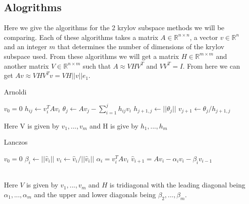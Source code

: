 \documentclass{article}
\begin{document}
\subsection{Alogrithms}
Here we give the algorithms for the 2 krylov subspace methods we will be comparing.
Each of these algorithms takes a matrix $A\in \mathbb{R}^{n\times n}$, a vector $v \in \mathbb{R}^n$ and an integer $m$ that determines the number of dimensions of the krylov subspace used.
From these algorithms we will get a matrix $H \in \mathbb{R}^{m\times m}$ and another matrix $V \in \mathbb{R}^{n\times m}$ such that $A \approx VHV^T$ and $VV^T = I$.
From here we can get $Av \approx VHV^Tv = VH||v||e_1$.

\begin{algorithm}
\caption{Arnoldi \cite{Fan2018}} %
\begin{algorithmic}
\State $v_0 = 0$
\State$h_{ij} \gets v_i^T A v_i$
\EndFor
\State$\theta_j \gets Av_j - \sum^j_{i=1} h_{ij}v_i$
\State$h_{j+1,j} \gets ||\theta_j||$
\State$v_{j+1} \gets \theta_j/h_{j+1,j}$
\EndFor
\EndProcedure
\end{algorithmic}
\end{algorithm}
Here V is given by $v_1,...,v_m$ and H is give by $h_1,...,h_m$
\begin{algorithm}
\caption{Lanczos \cite{OJALVO1970}}
\begin{algorithmic}
\State $v_0 = 0$
\State$\beta_i \gets || \hat v_i ||$
\State$v_i \gets \hat v_i / || \hat v_i ||$
\State$\alpha_i = v_i^T A v_i$
\State$\hat v_{i+1} = Av_i - \alpha_iv_i - \beta_iv_{i-1}$
\EndFor
\EndProcedure
\end{algorithmic}
\end{algorithm}\\
Here $V$ is given by ${v_1,...,v_m}$ and $H$ is tridiagonal with the leading diagonal being $\alpha_1, ..., \alpha_m$ and the upper and lower diagonals being $\beta_2,...,\beta_m$.
\newpage


\end{document}
